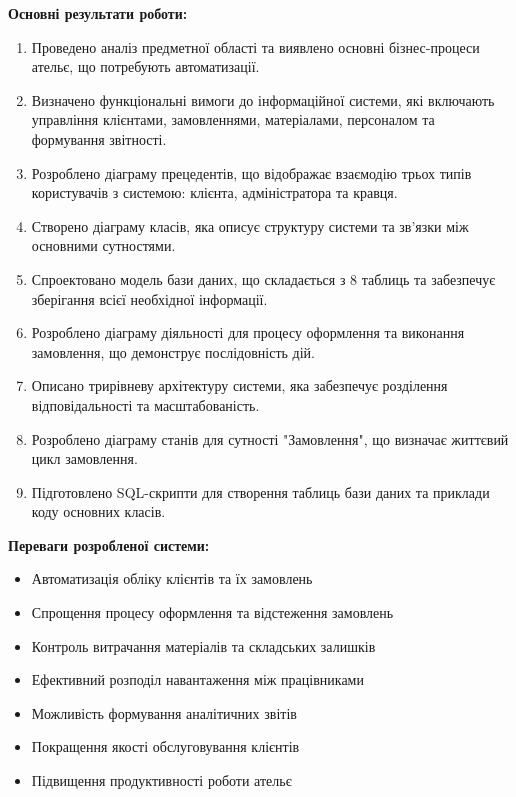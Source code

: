 \documentclass[14pt,a4paper]{extarticle}
\begin{document}
\textbf{Основні результати роботи:}

\begin{enumerate}
    \item Проведено аналіз предметної області та виявлено основні бізнес-процеси ательє, що потребують автоматизації.
    
    \item Визначено функціональні вимоги до інформаційної системи, які включають управління клієнтами, замовленнями, матеріалами, персоналом та формування звітності.
    
    \item Розроблено діаграму прецедентів, що відображає взаємодію трьох типів користувачів з системою: клієнта, адміністратора та кравця.
    
    \item Створено діаграму класів, яка описує структуру системи та зв'язки між основними сутностями.
    
    \item Спроектовано модель бази даних, що складається з 8 таблиць та забезпечує зберігання всієї необхідної інформації.
    
    \item Розроблено діаграму діяльності для процесу оформлення та виконання замовлення, що демонструє послідовність дій.
    
    \item Описано трирівневу архітектуру системи, яка забезпечує розділення відповідальності та масштабованість.
    
    \item Розроблено діаграму станів для сутності "Замовлення", що визначає життєвий цикл замовлення.
    
    \item Підготовлено SQL-скрипти для створення таблиць бази даних та приклади коду основних класів.
\end{enumerate}

\textbf{Переваги розробленої системи:}

\begin{itemize}
    \item Автоматизація обліку клієнтів та їх замовлень
    \item Спрощення процесу оформлення та відстеження замовлень
    \item Контроль витрачання матеріалів та складських залишків
    \item Ефективний розподіл навантаження між працівниками
    \item Можливість формування аналітичних звітів
    \item Покращення якості обслуговування клієнтів
    \item Підвищення продуктивності роботи ательє
\end{itemize}
\end{document}
